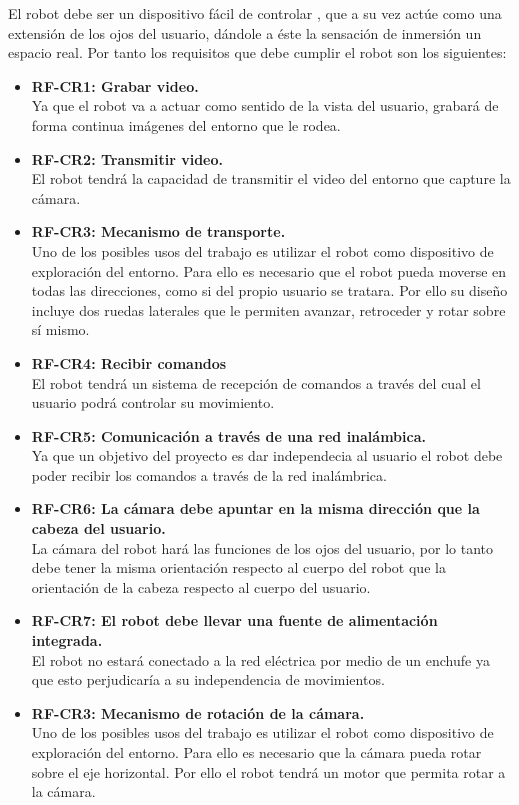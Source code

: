 \documentclass[twoside, 11pt]{epstfg}
\begin{document}
El robot debe ser un dispositivo fácil de controlar , que a su vez actúe como una extensión de los ojos del usuario, dándole a éste la sensación de inmersión un espacio real.
Por tanto los requisitos que debe cumplir el robot son los siguientes:


\begin{itemize}
	\item \textbf{RF-CR1: Grabar video.}\\
	 Ya que el robot va a actuar como sentido de la vista del usuario, grabará de forma continua imágenes del entorno que le rodea.
	
	\item \textbf{RF-CR2: Transmitir video.}\\
	El robot tendrá la capacidad de transmitir el video del entorno que capture la cámara. 

	\item\textbf{RF-CR3: Mecanismo de transporte.} \\
	Uno de los posibles usos del trabajo es utilizar el robot como dispositivo de exploración del entorno. Para ello es necesario que el robot pueda moverse en todas las direcciones, como si del propio usuario se tratara. Por ello su diseño incluye dos ruedas laterales que le permiten avanzar, retroceder y rotar sobre sí mismo.
	
	
	\item\textbf{RF-CR4: Recibir comandos} \\
	El robot tendrá un sistema de recepción de comandos a través del cual el usuario podrá controlar su movimiento.
	
	
	\item\textbf{RF-CR5: Comunicación a través de una red inalámbica.}\\
	Ya que un objetivo del proyecto es dar independecia al usuario el robot debe poder recibir los comandos a través de la red inalámbrica.
	
	\item\textbf{RF-CR6: La cámara debe apuntar en la misma dirección que la cabeza del usuario.}\\
	La cámara del robot hará las funciones de los ojos del usuario, por lo tanto debe tener la misma orientación respecto al cuerpo del robot que la orientación de la cabeza respecto al cuerpo del usuario.
	
	\item \textbf{RF-CR7: El robot debe llevar una fuente de alimentación integrada.}\\
	El robot no estará conectado a la red eléctrica por medio de un enchufe ya que esto perjudicaría a su independencia de movimientos. 
	
	\item\textbf{RF-CR3: Mecanismo de rotación de la cámara.} \\
	Uno de los posibles usos del trabajo es utilizar el robot como dispositivo de exploración del entorno. Para ello es necesario que la cámara pueda rotar sobre el eje horizontal. Por ello el robot tendrá un motor que permita rotar a la cámara.
\end{itemize}
\end{document}
